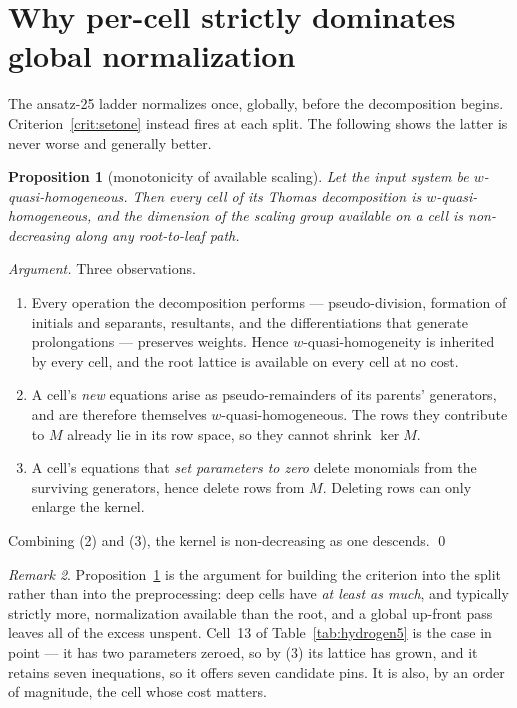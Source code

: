 \documentclass[11pt]{article}
\theoremstyle{plain}
\newtheorem{proposition}{Proposition}
\theoremstyle{definition}
\theoremstyle{remark}
\newtheorem{remark}[proposition]{Remark}
\begin{document}
\section{Why per-cell strictly dominates global normalization}
\label{sec:monotone}

The ansatz-25 ladder \cite{ansatz25} normalizes once, globally, before the
decomposition begins. Criterion~\ref{crit:setone} instead fires at each split.
The following shows the latter is never worse and generally better.

\begin{proposition}[monotonicity of available scaling]
\label{prop:monotone}
Let the input system be $w$-quasi-homogeneous. Then every cell of its Thomas
decomposition is $w$-quasi-homogeneous, and the dimension of the scaling group
available on a cell is non-decreasing along any root-to-leaf path.
\end{proposition}

\begin{proof}[Argument]
Three observations.
\begin{enumerate}
\item Every operation the decomposition performs --- pseudo-division,
      formation of initials and separants, resultants, and the differentiations
      that generate prolongations --- preserves weights. Hence
      $w$-quasi-homogeneity is inherited by every cell, and the root lattice is
      available on every cell at no cost.
\item A cell's \emph{new} equations arise as pseudo-remainders of its parents'
      generators, and are therefore themselves $w$-quasi-homogeneous. The rows
      they contribute to $M$ already lie in its row space, so they cannot
      shrink $\ker M$.
\item A cell's equations that \emph{set parameters to zero} delete monomials
      from the surviving generators, hence delete rows from $M$. Deleting rows
      can only enlarge the kernel.
\end{enumerate}
Combining (2) and (3), the kernel is non-decreasing as one descends. \qed
\end{proof}

\begin{remark}
Proposition~\ref{prop:monotone} is the argument for building the criterion into
the split rather than into the preprocessing: deep cells have \emph{at least
as much}, and typically strictly more, normalization available than the root,
and a global up-front pass leaves all of the excess unspent. Cell~13 of
Table~\ref{tab:hydrogen5} is the case in point --- it has two parameters
zeroed, so by (3) its lattice has grown, and it retains seven inequations, so
it offers seven candidate pins. It is also, by an order of magnitude, the cell
whose cost matters.
\end{remark}
\end{document}
